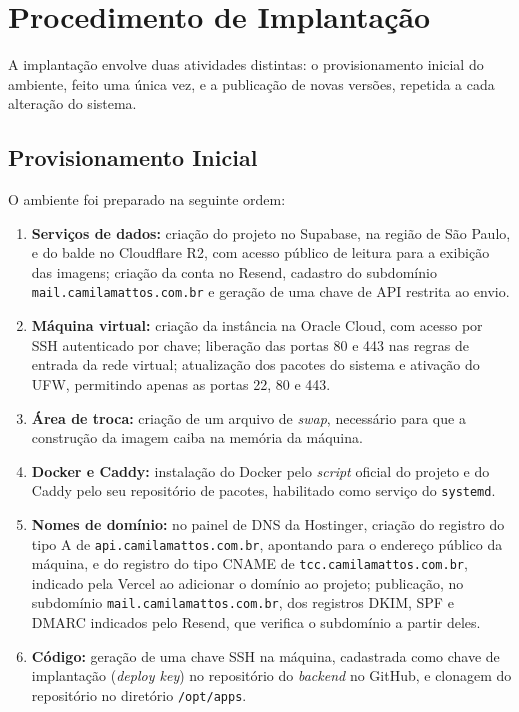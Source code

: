 \section{Procedimento de Implantação}
\label{sec:procedimento_implantacao}

A implantação envolve duas atividades distintas: o provisionamento inicial do ambiente, feito uma única vez, e a publicação de novas versões, repetida a cada alteração do sistema.

\subsection{Provisionamento Inicial}

O ambiente foi preparado na seguinte ordem:

\begin{enumerate}
	\item \textbf{Serviços de dados:} criação do projeto no Supabase, na região de São Paulo, e do balde no Cloudflare R2, com acesso público de leitura para a exibição das imagens; criação da conta no Resend, cadastro do subdomínio \texttt{mail.camilamattos.com.br} e geração de uma chave de API restrita ao envio.
	\item \textbf{Máquina virtual:} criação da instância na Oracle Cloud, com acesso por SSH autenticado por chave; liberação das portas 80 e 443 nas regras de entrada da rede virtual; atualização dos pacotes do sistema e ativação do UFW, permitindo apenas as portas 22, 80 e 443.
	\item \textbf{Área de troca:} criação de um arquivo de \textit{swap}, necessário para que a construção da imagem caiba na memória da máquina.
	\item \textbf{Docker e Caddy:} instalação do Docker pelo \textit{script} oficial do projeto e do Caddy pelo seu repositório de pacotes, habilitado como serviço do \texttt{systemd}.
	\item \textbf{Nomes de domínio:} no painel de DNS da Hostinger, criação do registro do tipo A de \texttt{api.camilamattos.com.br}, apontando para o endereço público da máquina, e do registro do tipo CNAME de \texttt{tcc.camilamattos.com.br}, indicado pela Vercel ao adicionar o domínio ao projeto; publicação, no subdomínio \texttt{mail.camilamattos.com.br}, dos registros DKIM, SPF e DMARC indicados pelo Resend, que verifica o subdomínio a partir deles.
	\item \textbf{Código:} geração de uma chave SSH na máquina, cadastrada como chave de implantação (\textit{deploy key}) no repositório do \textit{backend} no GitHub, e clonagem do repositório no diretório \texttt{/opt/apps}.

\end{enumerate}
